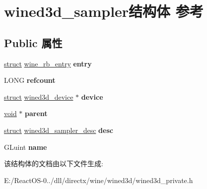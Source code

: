\hypertarget{structwined3d__sampler}{}\section{wined3d\+\_\+sampler结构体 参考}
\label{structwined3d__sampler}
\subsection*{Public 属性}
\begin{DoxyCompactItemize}
\item 
\mbox{\label{structwined3d__sampler_a598db28d9493814971a77184e06133a1}} 
\hyperlink{interfacestruct}{struct} \hyperlink{structwine__rb__entry}{wine\+\_\+rb\+\_\+entry} {\bfseries entry}
\item 
\mbox{\label{structwined3d__sampler_a287a98e9549927e60d7a90193aee61a1}} 
L\+O\+NG {\bfseries refcount}
\item 
\mbox{\label{structwined3d__sampler_aaf8e55616375791b577e631c85f520cc}} 
\hyperlink{interfacestruct}{struct} \hyperlink{structwined3d__device}{wined3d\+\_\+device} $\ast$ {\bfseries device}
\item 
\mbox{\label{structwined3d__sampler_a61c4f1a16182bdb8986cf3271fff181c}} 
\hyperlink{interfacevoid}{void} $\ast$ {\bfseries parent}
\item 
\mbox{\label{structwined3d__sampler_a448bb19166836b53447a52cb46916738}} 
\hyperlink{interfacestruct}{struct} \hyperlink{structwined3d__sampler__desc}{wined3d\+\_\+sampler\+\_\+desc} {\bfseries desc}
\item 
\mbox{\label{structwined3d__sampler_a2c7aa2a8fe126e7aeced0de87b74df17}} 
G\+Luint {\bfseries name}
\end{DoxyCompactItemize}


该结构体的文档由以下文件生成\+:\begin{DoxyCompactItemize}
\item 
E\+:/\+React\+O\+S-\/0../dll/directx/wine/wined3d/wined3d\+\_\+private.\+h\end{DoxyCompactItemize}

